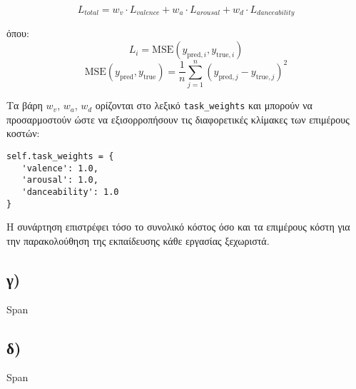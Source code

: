 \documentclass[a4paper,12pt]{article}
\begin{document}
\begin{equation}
L_{total} = w_v \cdot L_{valence} + w_a \cdot L_{arousal} + w_d \cdot L_{danceability}
\end{equation}

όπου:
\[ L_i = \text{MSE}(y_{\text{pred},i}, y_{\text{true},i}) \]
\[ \text{MSE}(y_{\text{pred}}, y_{\text{true}}) = \frac{1}{n}\sum_{j=1}^n (y_{\text{pred},j} - y_{\text{true},j})^2 \]

Τα βάρη \(w_v\), \(w_a\), \(w_d\) ορίζονται στο λεξικό \texttt{task\_weights} και μπορούν να προσαρμοστούν ώστε να εξισορροπήσουν τις διαφορετικές κλίμακες των επιμέρους κοστών:

\begin{verbatim}
self.task_weights = {
   'valence': 1.0,
   'arousal': 1.0,
   'danceability': 1.0
}
\end{verbatim}

Η συνάρτηση επιστρέφει τόσο το συνολικό κόστος όσο και τα επιμέρους κόστη για την παρακολούθηση της εκπαίδευσης κάθε εργασίας ξεχωριστά.

\subsection*{γ)}

Span

\subsection*{δ)}

Span



\end{document}
